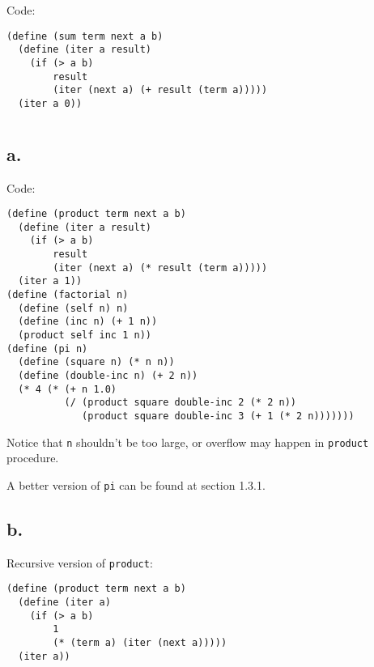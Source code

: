 \documentclass[../main.tex]{subfiles}
\begin{document}
Code:

\begin{lstlisting}
(define (sum term next a b)
  (define (iter a result)
    (if (> a b)
        result
        (iter (next a) (+ result (term a)))))
  (iter a 0))
\end{lstlisting}


\section{}

\subsection*{a.}

Code:

\begin{lstlisting}
(define (product term next a b)
  (define (iter a result)
    (if (> a b)
        result
        (iter (next a) (* result (term a)))))
  (iter a 1))
(define (factorial n)
  (define (self n) n)
  (define (inc n) (+ 1 n))
  (product self inc 1 n))
(define (pi n)
  (define (square n) (* n n))
  (define (double-inc n) (+ 2 n))
  (* 4 (* (+ n 1.0)
          (/ (product square double-inc 2 (* 2 n))
             (product square double-inc 3 (+ 1 (* 2 n)))))))
\end{lstlisting}

Notice that \lstinline{n} shouldn't be
 too large, or overflow may happen in
 \lstinline{product} procedure.

A better version of \lstinline{pi} can
 be found at section 1.3.1.

\subsection*{b.}

Recursive version of \lstinline{product}:

\begin{lstlisting}
(define (product term next a b)
  (define (iter a)
    (if (> a b)
        1
        (* (term a) (iter (next a)))))
  (iter a))
\end{lstlisting}


\section{}
\end{document}
